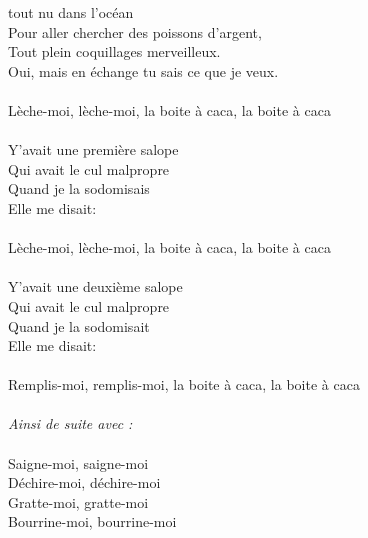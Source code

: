 
 tout nu dans l'océan
\\Pour aller chercher des poissons d'argent,
\\Tout plein coquillages merveilleux.
\\Oui, mais en échange tu sais ce que je veux.
\\\\Lèche-moi, lèche-moi, la boite à caca, la boite à caca \bissimple
\\\\Y'avait une première salope
\\Qui avait le cul malpropre
\\Quand je la sodomisais
\\Elle me disait:
\\\\Lèche-moi, lèche-moi, la boite à caca, la boite à caca \bissimple
\\\\Y'avait une deuxième salope
\\Qui avait le cul malpropre
\\Quand je la sodomisait
\\Elle me disait:
\\\\Remplis-moi, remplis-moi, la boite à caca, la boite à caca \bissimple
\\\\\textit{Ainsi de suite avec :}
\\\\Saigne-moi, saigne-moi
\\Déchire-moi, déchire-moi
\\Gratte-moi, gratte-moi
\\Bourrine-moi, bourrine-moi

\breakpage